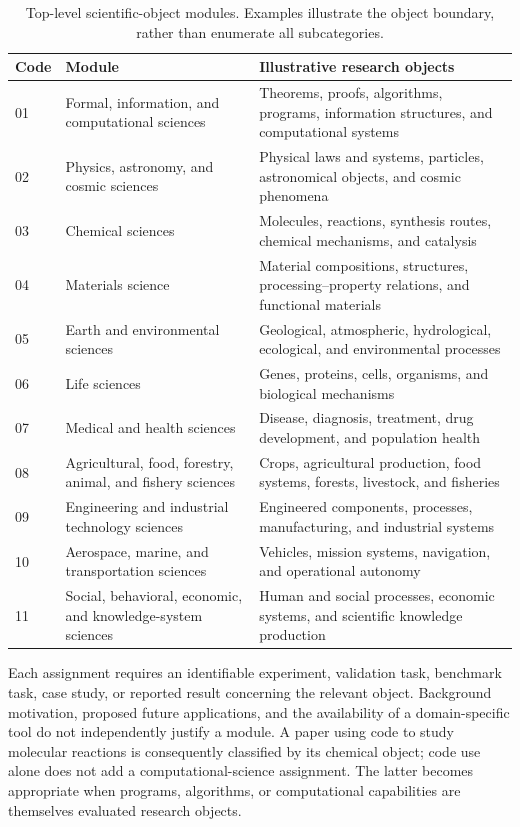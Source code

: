 \begin{table}[t]
\caption{Top-level scientific-object modules. Examples illustrate the object boundary, rather than enumerate all subcategories.}
\label{tab:domains}
\small
\begin{tabularx}{\textwidth}{@{}p{}>{\raggedright\arraybackslash}p{}>{\raggedright\arraybackslash}X@{}}
\toprule
Code & Module & Illustrative research objects \\
\midrule
01 & Formal, information, and computational sciences & Theorems, proofs, algorithms, programs, information structures, and computational systems \\
02 & Physics, astronomy, and cosmic sciences & Physical laws and systems, particles, astronomical objects, and cosmic phenomena \\
03 & Chemical sciences & Molecules, reactions, synthesis routes, chemical mechanisms, and catalysis \\
04 & Materials science & Material compositions, structures, processing--property relations, and functional materials \\
05 & Earth and environmental sciences & Geological, atmospheric, hydrological, ecological, and environmental processes \\
06 & Life sciences & Genes, proteins, cells, organisms, and biological mechanisms \\
07 & Medical and health sciences & Disease, diagnosis, treatment, drug development, and population health \\
08 & Agricultural, food, forestry, animal, and fishery sciences & Crops, agricultural production, food systems, forests, livestock, and fisheries \\
09 & Engineering and industrial technology sciences & Engineered components, processes, manufacturing, and industrial systems \\
10 & Aerospace, marine, and transportation sciences & Vehicles, mission systems, navigation, and operational autonomy \\
11 & Social, behavioral, economic, and knowledge-system sciences & Human and social processes, economic systems, and scientific knowledge production \\
\bottomrule
\end{tabularx}
\end{table}

Each assignment requires an identifiable experiment, validation task, benchmark task, case study, or reported result concerning the relevant object. Background motivation, proposed future applications, and the availability of a domain-specific tool do not independently justify a module. A paper using code to study molecular reactions is consequently classified by its chemical object; code use alone does not add a computational-science assignment. The latter becomes appropriate when programs, algorithms, or computational capabilities are themselves evaluated research objects.

